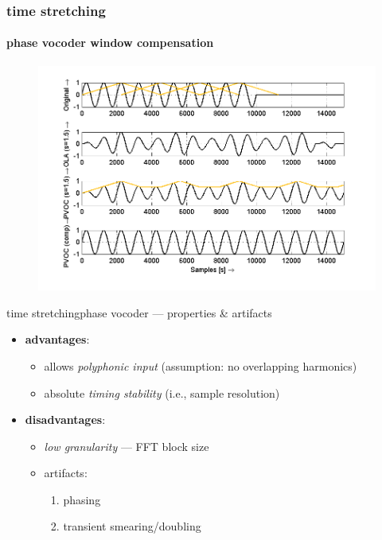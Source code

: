    \begin{frame}\frametitle{time stretching}\framesubtitle{phase vocoder window compensation}
        \begin{figure}
            \centerline{\includegraphics[scale=.7]{graph/pvocIntro}}
        \end{figure}
    \end{frame}

    \begin{frame}{time stretching}{phase vocoder --- properties \& artifacts}
        \begin{itemize}
            \item   \textbf{advantages}:
                \begin{itemize}
                    \item   allows \textit{polyphonic input} (assumption: no overlapping harmonics)
                    \item   absolute \textit{timing stability} (i.e., sample resolution)
                \end{itemize}   
            \pause
            \bigskip
            \item   \textbf{disadvantages}:
                \begin{itemize}
                    \item   \textit{low granularity} --- FFT block size
                    \item   artifacts:
                        \begin{enumerate}
                            \item   phasing
                            \item   transient smearing/doubling
                        \end{enumerate}
                \end{itemize}
        \end{itemize}
    \end{frame}

